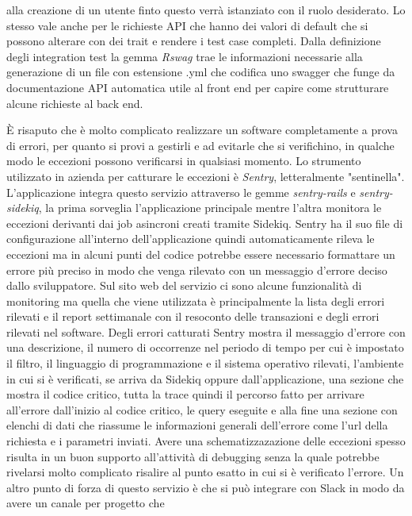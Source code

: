 \documentclass[target=bach,aauheader=,style=]{thud}
\begin{document}
alla creazione di un utente finto questo verrà istanziato con il ruolo desiderato. Lo stesso vale anche per le richieste API che hanno dei valori di default che si
possono alterare con dei trait e rendere i test case completi. Dalla definizione degli integration test la gemma \textit{Rswag}\cite{rswag_gem} trae le informazioni
necessarie alla generazione di un file con estensione .yml che codifica uno swagger che funge da documentazione API automatica utile al front end per capire come
strutturare alcune richieste al back end.
\par È risaputo che è molto complicato realizzare un software completamente a prova di errori, per quanto si provi a gestirli e ad evitarle che si verifichino, in qualche
modo le eccezioni possono verificarsi in qualsiasi momento. Lo strumento utilizzato in azienda per catturare le eccezioni è \textit{Sentry}\cite{sentry}, letteralmente "sentinella".
L'applicazione integra questo servizio attraverso le gemme \textit{sentry-rails}\cite{sentry_rails_gem} e \textit{sentry-sidekiq}\cite{sentry_sidekiq_gem}, la prima
sorveglia l'applicazione principale mentre l'altra monitora le eccezioni derivanti dai job asincroni creati tramite Sidekiq.
Sentry ha il suo file di configurazione all'interno dell'applicazione quindi automaticamente rileva le eccezioni ma in alcuni punti del codice potrebbe essere necessario
formattare un errore più preciso in modo che venga rilevato con un messaggio d'errore deciso dallo sviluppatore.
Sul sito web del servizio ci sono alcune funzionalità di monitoring ma quella che viene utilizzata è principalmente la lista degli errori rilevati e il report
settimanale con il resoconto delle transazioni e degli errori rilevati nel software. Degli errori catturati Sentry mostra il messaggio d'errore con una descrizione,
il numero di occorrenze nel periodo di tempo per cui è impostato il filtro, il linguaggio di programmazione e il sistema operativo rilevati, l'ambiente in cui si è
verificati, se arriva da Sidekiq oppure dall'applicazione, una sezione che mostra il codice critico, tutta la trace quindi il percorso fatto per arrivare all'errore
dall'inizio al codice critico, le query eseguite e alla fine una sezione con elenchi di dati che riassume le informazioni generali dell'errore come l'url della richiesta
e i parametri inviati. Avere una schematizzazazione delle eccezioni spesso risulta in un buon supporto all'attività di debugging senza la quale potrebbe rivelarsi molto
complicato risalire al punto esatto in cui si è verificato l'errore. Un altro punto di forza di questo servizio è che si può integrare con Slack in modo da avere un canale per progetto che
\end{document}
